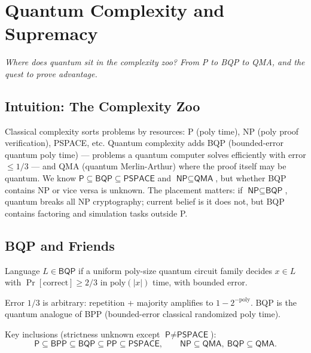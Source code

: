 \chapter{Quantum Complexity and Supremacy}\label{ch:complexity}
\begin{center}\small\textit{Where does quantum sit in the complexity zoo? From P to BQP to QMA, and the quest to prove advantage.}\end{center}

\section{Intuition: The Complexity Zoo}
Classical complexity sorts problems by resources: P (poly time), NP (poly proof verification), PSPACE, etc. Quantum complexity adds BQP (bounded-error quantum poly time) --- problems a quantum computer solves efficiently with error $\le1/3$ --- and QMA (quantum Merlin-Arthur) where the proof itself may be quantum. We know $\textsf{P}\subseteq\textsf{BQP}\subseteq\textsf{PSPACE}$ and $\textsf{NP}\subseteq\textsf{QMA}$, but whether BQP contains NP or vice versa is unknown. The placement matters: if $\textsf{NP}\subseteq\textsf{BQP}$, quantum breaks all NP cryptography; current belief is it does not, but BQP contains factoring and simulation tasks outside P.

\section{BQP and Friends}
\begin{definition}[BQP]
Language $L\in\textsf{BQP}$ if a uniform poly-size quantum circuit family decides $x\in L$ with $\Pr[\text{correct}]\ge2/3$ in $\mathrm{poly}(|x|)$ time, with bounded error.
\end{definition}
Error $1/3$ is arbitrary: repetition + majority amplifies to $1-2^{-\mathrm{poly}}$. BQP is the quantum analogue of BPP (bounded-error classical randomized poly time).

Key inclusions (strictness unknown except $\textsf{P}\neq\textsf{PSPACE}$):
\begin{equation}
\textsf{P}\subseteq\textsf{BPP}\subseteq\textsf{BQP}\subseteq\textsf{PP}\subseteq\textsf{PSPACE},\qquad
\textsf{NP}\subseteq\textsf{QMA},\ \textsf{BQP}\subseteq\textsf{QMA}.
\end{equation}

